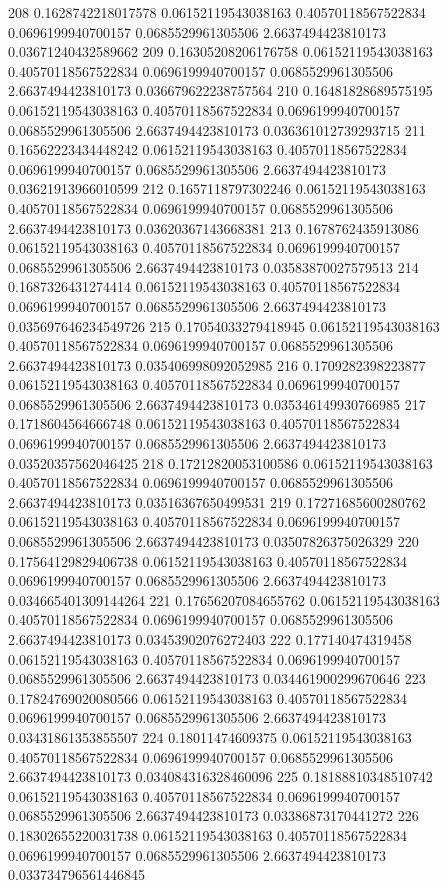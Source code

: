 {208 0.1628742218017578 0.06152119543038163 0.40570118567522834 0.0696199940700157 0.0685529961305506 2.6637494423810173 0.03671240432589662
209 0.16305208206176758 0.06152119543038163 0.40570118567522834 0.0696199940700157 0.0685529961305506 2.6637494423810173 0.036679622238757564
210 0.16481828689575195 0.06152119543038163 0.40570118567522834 0.0696199940700157 0.0685529961305506 2.6637494423810173 0.036361012739293715
211 0.16562223434448242 0.06152119543038163 0.40570118567522834 0.0696199940700157 0.0685529961305506 2.6637494423810173 0.03621913966010599
212 0.1657118797302246 0.06152119543038163 0.40570118567522834 0.0696199940700157 0.0685529961305506 2.6637494423810173 0.03620367143668381
213 0.1678762435913086 0.06152119543038163 0.40570118567522834 0.0696199940700157 0.0685529961305506 2.6637494423810173 0.03583870027579513
214 0.1687326431274414 0.06152119543038163 0.40570118567522834 0.0696199940700157 0.0685529961305506 2.6637494423810173 0.035697646234549726
215 0.17054033279418945 0.06152119543038163 0.40570118567522834 0.0696199940700157 0.0685529961305506 2.6637494423810173 0.035406998092052985
216 0.1709282398223877 0.06152119543038163 0.40570118567522834 0.0696199940700157 0.0685529961305506 2.6637494423810173 0.035346149930766985
217 0.1718604564666748 0.06152119543038163 0.40570118567522834 0.0696199940700157 0.0685529961305506 2.6637494423810173 0.03520357562046425
218 0.17212820053100586 0.06152119543038163 0.40570118567522834 0.0696199940700157 0.0685529961305506 2.6637494423810173 0.03516367650499531
219 0.17271685600280762 0.06152119543038163 0.40570118567522834 0.0696199940700157 0.0685529961305506 2.6637494423810173 0.03507826375026329
220 0.17564129829406738 0.06152119543038163 0.40570118567522834 0.0696199940700157 0.0685529961305506 2.6637494423810173 0.034665401309144264
221 0.17656207084655762 0.06152119543038163 0.40570118567522834 0.0696199940700157 0.0685529961305506 2.6637494423810173 0.03453902076272403
222 0.177140474319458 0.06152119543038163 0.40570118567522834 0.0696199940700157 0.0685529961305506 2.6637494423810173 0.034461900299670646
223 0.17824769020080566 0.06152119543038163 0.40570118567522834 0.0696199940700157 0.0685529961305506 2.6637494423810173 0.03431861353855507
224 0.18011474609375 0.06152119543038163 0.40570118567522834 0.0696199940700157 0.0685529961305506 2.6637494423810173 0.034084316328460096
225 0.18188810348510742 0.06152119543038163 0.40570118567522834 0.0696199940700157 0.0685529961305506 2.6637494423810173 0.03386873170441272
226 0.18302655220031738 0.06152119543038163 0.40570118567522834 0.0696199940700157 0.0685529961305506 2.6637494423810173 0.033734796561446845
}
